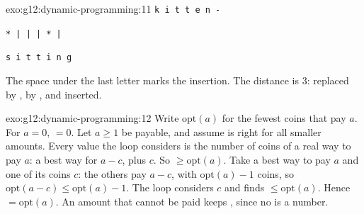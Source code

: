 \begin{solution}{exo:g12:dynamic-programming:11}
\smallskip\noindent\hspace*{2em}\texttt{k i t t e n -}

\noindent\hspace*{2em}\texttt{* | | | * |}

\noindent\hspace*{2em}\texttt{s i t t i n g}

\smallskip\noindent The space under the last letter marks the insertion. The distance is $3$:  replaced by ,  by , and  inserted.
\end{solution}

\begin{solution}{exo:g12:dynamic-programming:12}
Write $\mathrm{opt}(a)$ for the fewest coins that pay $a$. For $a = 0$,  $= 0$. Let $a \ge 1$ be
payable, and assume  is right for all smaller amounts. Every value  the loop
considers is the number of coins of a real way to pay $a$: a best way for $a - c$, plus $c$. So
 $\ge \mathrm{opt}(a)$. Take a best way to pay $a$ and one of its coins $c$: the others pay $a - c$, with
$\mathrm{opt}(a) - 1$ coins, so $\mathrm{opt}(a - c) \le \mathrm{opt}(a) - 1$. The loop considers $c$ and finds
 $\le \mathrm{opt}(a)$. Hence  $= \mathrm{opt}(a)$. An amount that cannot be paid
keeps , since no  is a number.
\end{solution}

